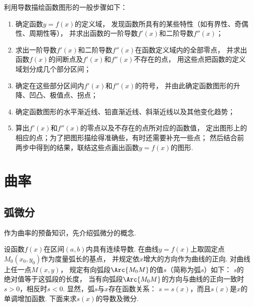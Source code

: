 利用导数描绘函数图形的一般步骤如下：\begin{enumerate}
	\item 确定函数\(y=f(x)\)的定义域，
	发现函数所具有的某些特性（如有界性、奇偶性、周期性等），
	并求出函数的一阶导数\(f'(x)\)和二阶导数\(f''(x)\)；

	\item 求出一阶导数\(f'(x)\)和二阶导数\(f''(x)\)在函数定义域内的全部零点，
	并求出函数\(f(x)\)的间断点及\(f'(x)\)和\(f''(x)\)不存在的点，
	用这些点把函数的定义域划分成几个部分区间；

	\item 确定在这些部分区间内\(f'(x)\)和\(f''(x)\)的符号，
	并由此确定函数图形的升降、凹凸、极值点、拐点；

	\item 确定函数图形的水平渐近线、铅直渐近线、斜渐近线以及其他变化趋势；

	\item 算出\(f'(x)\)和\(f''(x)\)的零点以及不存在的点所对应的函数值，
	定出图形上的相应的点；为了把图形描绘得准确些，有时还需要补充一些点；
	然后结合前两步中得到的结果，联结这些点画出函数\(y=f(x)\)的图形.
\end{enumerate}

\section{曲率}\label{section:微分中值定理.曲率}
\subsection{弧微分}
作为曲率的预备知识，先介绍弧微分的概念.

设函数\(f(x)\)在区间\((a,b)\)内具有连续导数.
在曲线\(y=f(x)\)上取固定点\(M_0(x_0,y_0)\)作为度量弧长的基点，
并规定依\(x\)增大的方向作为曲线的正向.
对曲线上任一点\(M(x,y)\)，
规定有向弧段\(\Arc{M_0 M}\)的值\(s\)（简称为弧\(s\)）如下：
\(s\)的绝对值等于这弧段的长度，
当有向弧段\(\Arc{M_0 M}\)的方向与曲线的正向一致时\(s>0\)，相反时\(s<0\).
显然，弧\(s\)与\(x\)存在函数关系：
\(s = s(x)\)，而且\(s(x)\)是\(x\)的单调增加函数.
下面来求\(s(x)\)的导数及微分.

